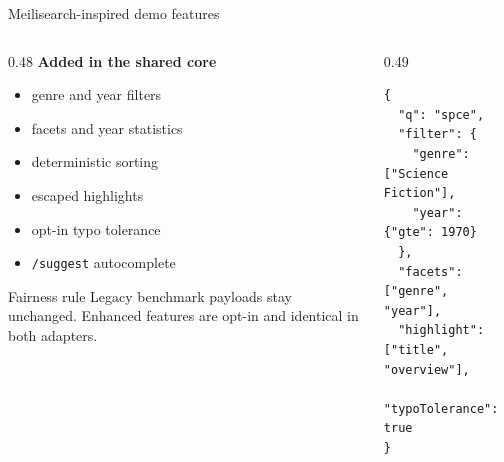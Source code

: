 \documentclass[aspectratio=169,10pt]{beamer}
\begin{document}
\begin{frame}[fragile]{Meilisearch-inspired demo features}
  \begin{columns}[T,onlytextwidth]
    \begin{column}{0.48\linewidth}
      \textbf{Added in the shared core}
      \begin{itemize}
        \item genre and year filters
        \item facets and year statistics
        \item deterministic sorting
        \item escaped highlights
        \item opt-in typo tolerance
        \item \texttt{/suggest} autocomplete
      \end{itemize}

      \begin{block}{Fairness rule}
        Legacy benchmark payloads stay unchanged. Enhanced features are opt-in and identical in both adapters.
      \end{block}
    \end{column}
    \begin{column}{0.49\linewidth}
      \begin{lstlisting}
{
  "q": "spce",
  "filter": {
    "genre": ["Science Fiction"],
    "year": {"gte": 1970}
  },
  "facets": ["genre", "year"],
  "highlight": ["title", "overview"],
  "typoTolerance": true
}
      \end{lstlisting}
    \end{column}
  \end{columns}
\end{frame}
\end{document}
